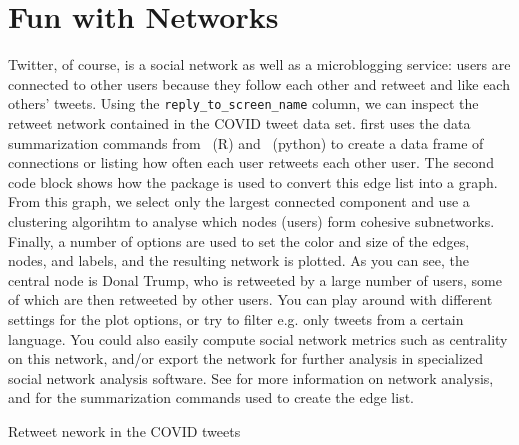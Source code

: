

\section{Fun with Networks}

Twitter, of course, is a social network as well as a microblogging service:
users are connected to other users because they follow each other and retweet and like each others' tweets.
Using the \verb+reply_to_screen_name+ column, we can inspect the retweet network contained in the COVID tweet data set.
 first uses the data summarization commands from \tidyverse\ (R) and \pandas\ (python) to
create a data frame of connections or  listing how often each user retweets each other user.
The second code block shows how the  package is used to convert this edge list into a graph.
From this graph, we select only the largest connected component and use a clustering algorihtm to analyse which
nodes (users) form cohesive subnetworks.
Finally, a number of options are used to set the color and size of the edges, nodes, and labels,
and the resulting network is plotted.
As you can see, the central node is Donal Trump, who is retweeted by a large number of users,
some of which are then retweeted by other users.
You can play around with different settings for the plot options,
or try to filter e.g. only tweets from a certain language. 
You could also easily compute social network metrics such as centrality on this network,
and/or export the network for further analysis in specialized social network analysis software.
See  for more information on network analysis,
and  for the summarization commands used to create the edge list.

\begin{ccsexample}
\caption{Retweet nework in the COVID tweets}\label{ex:fungraph}
\end{ccsexample}

